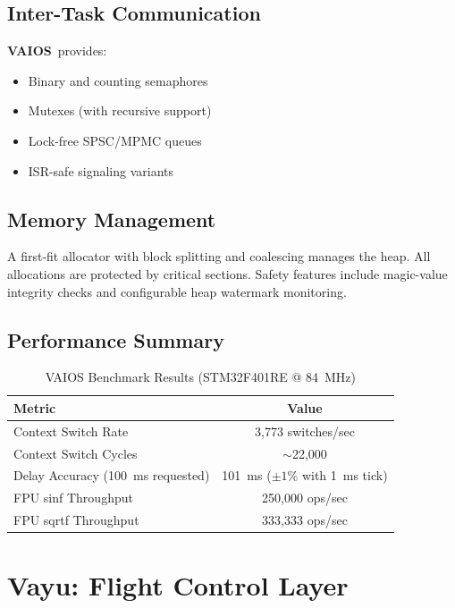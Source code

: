 \documentclass[11pt]{article}
\newcommand{\vaios}{\textbf{VAIOS}}
\begin{document}
\subsection{Inter-Task Communication}

\vaios~provides:
\begin{itemize}[leftmargin=*]
    \item Binary and counting semaphores
    \item Mutexes (with recursive support)
    \item Lock-free SPSC/MPMC queues
    \item ISR-safe signaling variants
\end{itemize}

\subsection{Memory Management}

A first-fit allocator with block splitting and coalescing manages the heap. All allocations are protected by critical sections. Safety features include magic-value integrity checks and configurable heap watermark monitoring.

\subsection{Performance Summary}

\begin{table}[H]
\centering
\caption{VAIOS Benchmark Results (STM32F401RE @ 84~MHz)}
\begin{tabular}{lc}
\toprule
\textbf{Metric} & \textbf{Value} \\
\midrule
Context Switch Rate & 3,773 switches/sec \\
Context Switch Cycles & $\sim$22,000 \\
Delay Accuracy (100~ms requested) & 101~ms ($\pm1\%$ with 1~ms tick) \\
FPU sinf Throughput & 250,000 ops/sec \\
FPU sqrtf Throughput & 333,333 ops/sec \\
\bottomrule
\end{tabular}
\end{table}

\section{Vayu: Flight Control Layer}
\end{document}
